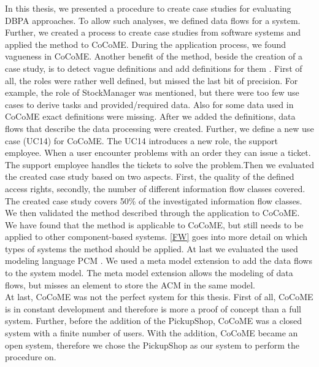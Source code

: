  

In this thesis, we presented a procedure to create case studies for evaluating DBPA approaches. To allow such analyses, we defined data flows for a system. Further, we created a process to create case studies from software systems and applied the method to CoCoME. During the application process, we found vagueness in CoCoME.  Another benefit of the method, beside the creation of a case study, is to detect vague definitions and add definitions for them . First of all, the roles were rather well defined, but missed the last bit of precision. For example, the role of StockManager was mentioned, but there were too few use cases to derive tasks and provided/required data. Also for some data used in CoCoME exact definitions were missing. After we added the definitions, data flows that describe the data processing were created. Further, we define a new use case (UC14) for CoCoME. The UC14 introduces a new role, the support employee. When a user encounter problems with an order they can issue a ticket. The support employee handles the tickets to solve the problem.Then we evaluated the created case study based on two aspects. First, the quality of the defined access rights, secondly, the number of different information flow classes covered. The created case study  covers 50\% of the investigated information flow classes. We then validated the method described through the application to CoCoME. We have found that the method is applicable to CoCoME, but still needs to be applied to other component-based systems.  \autoref{FW} goes into more detail on which types of systems the method should be applied.  At last we evaluated the used modeling language PCM \cite{PCM}. We used a meta model extension to add the data flows to the system model. The meta model extension allows the modeling of data flows, but misses an element to store the ACM in the same model.\\

At last, CoCoME was not the perfect system for this thesis. First of all, CoCoME is in constant development and therefore is more a proof of concept than a full system. Further, before the addition of the PickupShop, CoCoME was a closed system with a finite number of users. With the addition, CoCoME became an open system, therefore we chose the PickupShop as our system to perform the procedure on.
